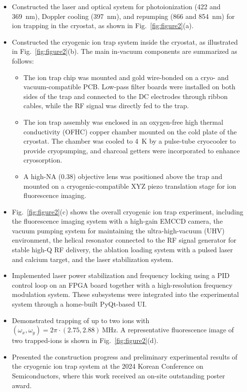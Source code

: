 \documentclass[11pt,a4paper]{article}
\begin{document}
\begin{itemize}[leftmargin=3.0em, itemsep=0.0em, topsep=-0.0 mm]
    \item Constructed the laser and optical system for photoionization (422 and 369~nm), Doppler cooling (397~nm), and repumping (866 and 854~nm) for ion trapping in the cryostat, as shown in Fig.~\ref{fig:figure2}(a).

    \item Constructed the cryogenic ion trap system inside the cryostat, as illustrated in Fig.~\ref{fig:figure2}(b). The main in-vacuum components are summarized as follows:
    \begin{itemize}[leftmargin=2.0em, itemsep=0.0em, topsep=0.2em]
        \item The ion trap chip was mounted and gold wire-bonded on a cryo- and vacuum-compatible PCB. Low-pass filter boards were installed on both sides of the trap and connected to the DC electrodes through ribbon cables, while the RF signal was directly fed to the trap.
        \item The ion trap assembly was enclosed in an oxygen-free high thermal conductivity (OFHC) copper chamber mounted on the cold plate of the cryostat. The chamber was cooled to 4~K by a pulse-tube cryocooler to provide cryopumping, and charcoal getters were incorporated to enhance cryosorption.
        \item A high-NA (0.38) objective lens was positioned above the trap and mounted on a cryogenic-compatible XYZ piezo translation stage for ion fluorescence imaging.
    \end{itemize}

    \item Fig.~\ref{fig:figure2}(c) shows the overall cryogenic ion trap experiment, including the fluorescence imaging system with a high-gain EMCCD camera, the vacuum pumping system for maintaining the ultra-high-vacuum (UHV) environment, the helical resonator connected to the RF signal generator for stable high-Q RF delivery, the ablation loading system with a pulsed laser and calcium target, and the laser stabilization system.

    \item Implemented laser power stabilization and frequency locking using a PID control loop on an FPGA board together with a high-resolution frequency modulation system. These subsystems were integrated into the experimental system through a home-built PyQt-based UI.

    \item Demonstrated trapping of up to two ions with $(\omega_x,\omega_y)=2\pi\cdot(2.75,2.88)~\mathrm{MHz}$. A representative fluorescence image of two trapped-ions is shown in Fig.~\ref{fig:figure2}(d).

    \item Presented the construction progress and preliminary experimental results of the cryogenic ion trap system at the 2024 Korean Conference on Semiconductors, where this work received an on-site outstanding poster award.
\end{itemize}
\end{document}
